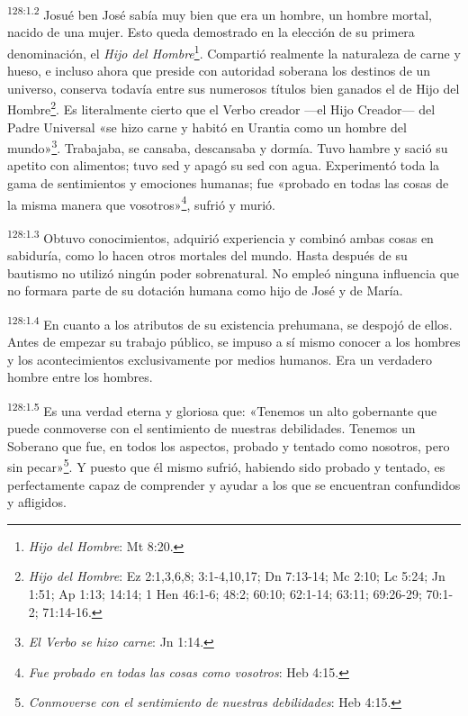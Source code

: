 \par
\textsuperscript{128:1.2} Josué ben José sabía muy bien que era un hombre, un hombre mortal, nacido de una mujer. Esto queda demostrado en la elección de su primera denominación, el \textit{Hijo del Hombre}\footnote{\textit{Hijo del Hombre}: Mt 8:20.}. Compartió realmente la naturaleza de carne y hueso, e incluso ahora que preside con autoridad soberana los destinos de un universo, conserva todavía entre sus numerosos títulos bien ganados el de Hijo del Hombre\footnote{\textit{Hijo del Hombre}: Ez 2:1,3,6,8; 3:1-4,10,17; Dn 7:13-14; Mc 2:10; Lc 5:24; Jn 1:51; Ap 1:13; 14:14; 1 Hen 46:1-6; 48:2; 60:10; 62:1-14; 63:11; 69:26-29; 70:1-2; 71:14-16.}. Es literalmente cierto que el Verbo creador ---el Hijo Creador--- del Padre Universal «se hizo carne y habitó en Urantia como un hombre del mundo»\footnote{\textit{El Verbo se hizo carne}: Jn 1:14.}. Trabajaba, se cansaba, descansaba y dormía. Tuvo hambre y sació su apetito con alimentos; tuvo sed y apagó su sed con agua. Experimentó toda la gama de sentimientos y emociones humanas; fue «probado en todas las cosas de la misma manera que vosotros»\footnote{\textit{Fue probado en todas las cosas como vosotros}: Heb 4:15.}, sufrió y murió.

\par
\textsuperscript{128:1.3} Obtuvo conocimientos, adquirió experiencia y combinó ambas cosas en sabiduría, como lo hacen otros mortales del mundo. Hasta después de su bautismo no utilizó ningún poder sobrenatural. No empleó ninguna influencia que no formara parte de su dotación humana como hijo de José y de María.

\par
\textsuperscript{128:1.4} En cuanto a los atributos de su existencia prehumana, se despojó de ellos. Antes de empezar su trabajo público, se impuso a sí mismo conocer a los hombres y los acontecimientos exclusivamente por medios humanos. Era un verdadero hombre entre los hombres.

\par
\textsuperscript{128:1.5} Es una verdad eterna y gloriosa que: «Tenemos un alto gobernante que puede conmoverse con el sentimiento de nuestras debilidades. Tenemos un Soberano que fue, en todos los aspectos, probado y tentado como nosotros, pero sin pecar»\footnote{\textit{Conmoverse con el sentimiento de nuestras debilidades}: Heb 4:15.}. Y puesto que él mismo sufrió, habiendo sido probado y tentado, es perfectamente capaz de comprender y ayudar a los que se encuentran confundidos y afligidos.

